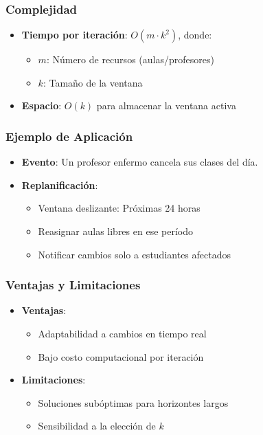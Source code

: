 \documentclass[12pt, a4paper]{article}
\begin{document}
\subsubsection*{Complejidad}
\begin{itemize}
    \item \textbf{Tiempo por iteración}: \( O(m \cdot k^2) \), donde:
    \begin{itemize}
        \item \( m \): Número de recursos (aulas/profesores)
        \item \( k \): Tamaño de la ventana
    \end{itemize}
    \item \textbf{Espacio}: \( O(k) \) para almacenar la ventana activa
\end{itemize}

\subsubsection*{Ejemplo de Aplicación}
\begin{itemize}
    \item \textbf{Evento}: Un profesor enfermo cancela sus clases del día.
    \item \textbf{Replanificación}:
    \begin{itemize}
        \item Ventana deslizante: Próximas 24 horas
        \item Reasignar aulas libres en ese período
        \item Notificar cambios solo a estudiantes afectados
    \end{itemize}
\end{itemize}

\subsubsection*{Ventajas y Limitaciones}
\begin{itemize}
    \item \textbf{Ventajas}:
    \begin{itemize}
        \item Adaptabilidad a cambios en tiempo real
        \item Bajo costo computacional por iteración
    \end{itemize}
    
    \item \textbf{Limitaciones}:
    \begin{itemize}
        \item Soluciones subóptimas para horizontes largos
        \item Sensibilidad a la elección de \( k \)
    \end{itemize}
\end{itemize}
\end{document}

